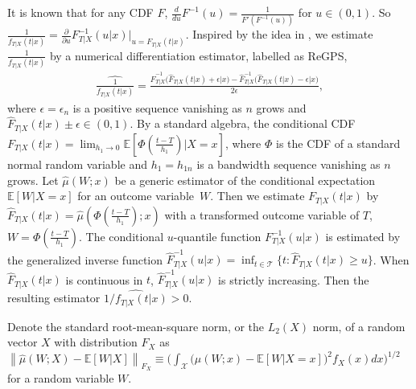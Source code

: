 \documentclass[lettersize, 12pt]{article}
\begin{document}
It is known that for any CDF $F$, $\frac{d}{du} F^{-1}(u) = \frac{1}{F'(F^{-1}(u))}$ for $u\in(0,1)$.
So $\frac{1}{f_{T|X}(t|x)} = \frac{\partial}{\partial u} F^{-1}_{T|X}(u|x)\big|_{u=F_{T|X}(t|x)}$.
Inspired by the idea in \cite{Koenker94},
we estimate $\frac{1}{f_{T|X}(t|x)}$ by a numerical differentiation estimator, labelled as ReGPS,
\begin{align}
\widehat{\frac{1}{f_{T|X}(t|x)}} 
= 
\frac{\hat F_{T|X}^{-1}\big(\hat F_{T|X}(t|x) + \epsilon\big|x\big) - \hat F_{T|X}^{-1}\big(\hat F_{T|X}(t|x) - \epsilon\big|x\big)}{2\epsilon},
\tag{ReGPS}\label{ReGPS}
\end{align}
where
$\epsilon = \epsilon_{n}$ is a positive sequence vanishing as $n$ grows and
$\hat F_{T|X}(t|x) \pm \epsilon \in (0,1)$.
By a standard algebra, the conditional CDF $F_{T|X}(t|x) = \lim_{h_1 \rightarrow 0} \mathbb{E}\left[\Phi\left(\frac{t-T}{h_1}\right)\big|X=x \right]$, where
$\Phi$ is the CDF of a standard normal random variable and 
$h_1 = h_{1n}$ is a bandwidth sequence vanishing as $n$ grows.
Let $\hat\mu(W; x)$ be a generic estimator of the conditional expectation $\mathbb{E}\left[W|X= x\right]$ 
for an outcome variable~$W$.
Then we estimate $F_{T|X}(t|x)$ by $\hat F_{T|X}(t|x) = \hat \mu\left(\Phi\left(\frac{t-T}{h_1}\right);x\right)$ with a transformed outcome variable of $T$, $W = \Phi\left(\frac{t-T}{h_1}\right)$.
The conditional $u$-quantile function $F_{T|X}^{-1}(u|x)$ is estimated by the generalized inverse function $\hat F_{T|X}^{-1}(u|x) = \inf_{t\in\mathcal{T}}\{t: \hat F_{T|X}(t|x) \geq u\}$.
When $\hat F_{T|X}(t|x)$ is continuous in $t$, $\hat F^{-1}_{T|X}(u|x)$ is strictly increasing.
Then the resulting estimator $\widehat{1/f_{T|X}(t|x)} > 0$.


Denote the standard root-mean-square norm, or the $L_2(X)$ norm, of a random vector $X$ with distribution $F_X$ as $\left\|\hat\mu(W; X) - \mathbb{E}[W|X]\right\|_{F_X} \equiv \Big(\int_\mathcal{X} \big(\hat\mu(W; x) - \mathbb{E}[W|X=x]\big)^2 f_X(x)dx \Big)^{1/2}$ for a random variable $W$.
\end{document}
